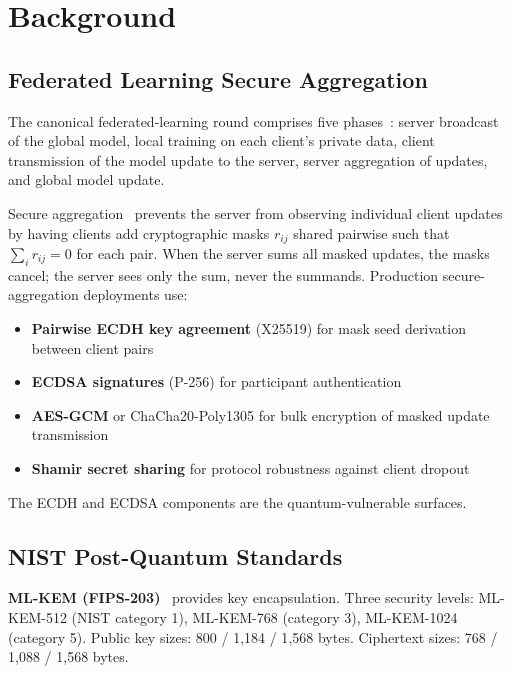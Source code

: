 \documentclass[sigconf,nonacm]{acmart}
\begin{document}
\section{Background}

\subsection{Federated Learning Secure Aggregation}

The canonical federated-learning round comprises five
phases~\cite{mcmahan2017fedavg,kairouz2021advances}: server broadcast
of the global model, local training on each client's private data,
client transmission of the model update to the server, server
aggregation of updates, and global model update.

Secure aggregation~\cite{bonawitz2017secagg} prevents the server from
observing individual client updates by having clients add cryptographic
masks $r_{ij}$ shared pairwise such that
$\sum_i r_{ij} = 0$ for each pair. When the server sums all masked
updates, the masks cancel; the server sees only the sum, never the
summands. Production secure-aggregation deployments use:

\begin{itemize}
  \item \textbf{Pairwise ECDH key agreement} (X25519) for mask seed
        derivation between client pairs
  \item \textbf{ECDSA signatures} (P-256) for participant
        authentication
  \item \textbf{AES-GCM} or ChaCha20-Poly1305 for bulk encryption of
        masked update transmission
  \item \textbf{Shamir secret sharing} for protocol robustness
        against client dropout
\end{itemize}

The ECDH and ECDSA components are the quantum-vulnerable surfaces.

\subsection{NIST Post-Quantum Standards}

\textbf{ML-KEM (FIPS-203)}~\cite{nist2024fips203} provides key
encapsulation. Three security levels: ML-KEM-512 (NIST category 1),
ML-KEM-768 (category 3), ML-KEM-1024 (category 5). Public key sizes:
800 / 1{,}184 / 1{,}568 bytes. Ciphertext sizes: 768 / 1{,}088 /
1{,}568 bytes.
\end{document}
